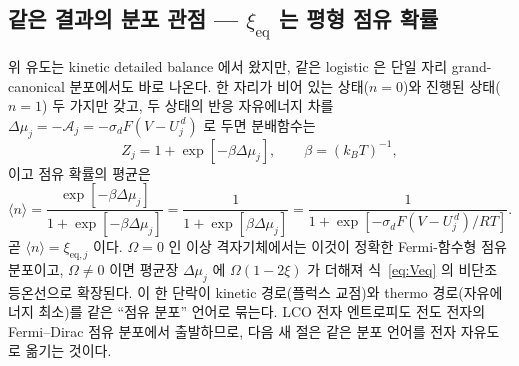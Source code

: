 \documentclass[11pt,a4paper]{article}
\newcommand{\eq}{\mathrm{eq}}
\begin{document}
\subsection{같은 결과의 분포 관점 — $\xi_\eq$ 는 평형 점유 확률}
위 유도는 kinetic detailed balance 에서 왔지만, 같은 logistic 은 단일 자리 grand-canonical 분포에서도 바로 나온다.
한 자리가 비어 있는 상태($n=0$)와 진행된 상태($n=1$) 두 가지만 갖고, 두 상태의 반응 자유에너지 차를
$\Delta\mu_j=-\mathcal A_j=-\sigma_dF(V-U_j^{\,d})$ 로 두면 분배함수는
\begin{equation}
Z_j=1+\exp[-\beta\Delta\mu_j],\qquad \beta=(k_BT)^{-1},
\label{eq:xidistZ}
\end{equation}
이고 점유 확률의 평균은
\begin{equation}
\langle n\rangle=\frac{\exp[-\beta\Delta\mu_j]}{1+\exp[-\beta\Delta\mu_j]}
=\frac{1}{1+\exp[\beta\Delta\mu_j]}
=\frac{1}{1+\exp[-\sigma_dF(V-U_j^{\,d})/RT]}.
\label{eq:xidist}
\end{equation}
곧 $\langle n\rangle=\xi_{\eq,j}$ 이다. $\Omega=0$ 인 이상 격자기체에서는 이것이 정확한 Fermi-함수형 점유
분포이고, $\Omega\ne0$ 이면 평균장 $\Delta\mu_j$ 에 $\Omega(1-2\xi)$ 가 더해져 식~\eqref{eq:Veq} 의
비단조 등온선으로 확장된다. 이 한 단락이 kinetic 경로(플럭스 교점)와 thermo 경로(자유에너지 최소)를 같은
``점유 분포'' 언어로 묶는다. LCO 전자 엔트로피도 전도 전자의 Fermi--Dirac 점유 분포에서 출발하므로, 다음 새 절은
같은 분포 언어를 전자 자유도로 옮기는 것이다.
\end{document}

